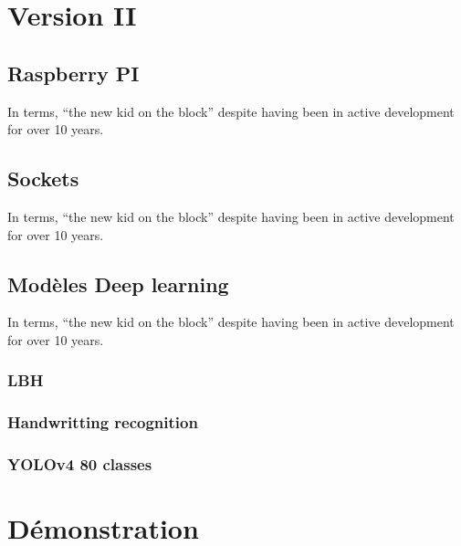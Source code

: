 {%
\pagebreak

\chapter{Version II}\thispagestyle{fancy}
\section{Raspberry PI}
In terms, “the new kid on the block” despite having been in active development for over 10 years.

\section{Sockets}
In terms, “the new kid on the block” despite having been in active development for over 10 years.

\section{Modèles Deep learning}
In terms, “the new kid on the block” despite having been in active development for over 10 years.
\subsection{LBH}
\subsection{Handwritting recognition}
\subsection{YOLOv4 80 classes}



\pagebreak
{}
\chapter{Démonstration}\thispagestyle{fancy}


\pagebreak
{}

}
